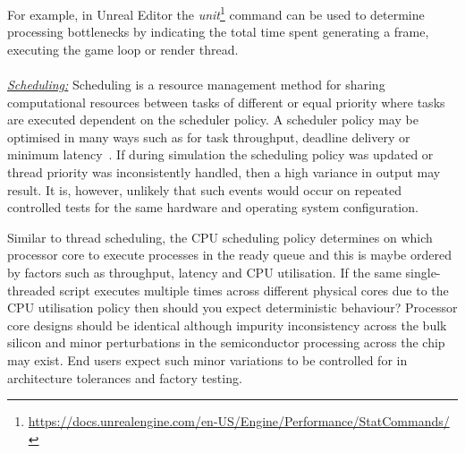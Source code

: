 \documentclass[letterpaper, 10 pt, journal, twoside]{IEEEtran}
\begin{document}
For example, in Unreal Editor the \textit{unit}\footnote{\url{https://docs.unrealengine.com/en-US/Engine/Performance/StatCommands/}} command can be used to determine processing bottlenecks by indicating the total time spent generating a frame, executing the game loop or render thread.
\\\\
\noindent\underline{\textit{Scheduling:}} %
Scheduling is a resource management method for sharing computational resources between tasks of different or equal priority where tasks are executed dependent on the scheduler policy. A scheduler policy may be optimised in many ways such as for task throughput, deadline delivery or minimum latency~\cite{liu1973scheduling}. 
%
If during simulation the scheduling policy was updated or thread priority was inconsistently handled, then a high variance in output may result. It is, however, unlikely that such events would occur on repeated controlled tests for the same hardware and operating system configuration.

Similar to thread scheduling, the CPU scheduling policy determines on which processor core to execute processes in the ready queue and this is maybe ordered by factors such as throughput, latency and CPU utilisation. If the same single-threaded script executes multiple times across different physical cores due to the CPU utilisation policy then should you expect deterministic behaviour? Processor core designs should be identical although impurity inconsistency across the bulk silicon and minor perturbations in the semiconductor processing across the chip may exist. End users expect such minor variations to be controlled for in architecture tolerances and factory testing.
\end{document}
